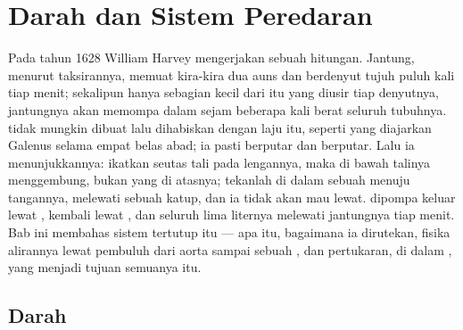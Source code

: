 \chapter{Darah dan Sistem Peredaran}\label{ch:b2:blood-circulation}

Pada tahun 1628 William Harvey mengerjakan sebuah hitungan. Jantung,
menurut taksirannya, memuat kira-kira dua auns  dan berdenyut tujuh
puluh kali tiap menit; sekalipun hanya sebagian kecil dari itu yang
diusir tiap denyutnya, jantungnya akan memompa dalam sejam beberapa
kali berat seluruh tubuhnya.  tidak mungkin dibuat lalu
dihabiskan dengan laju itu, seperti yang diajarkan Galenus selama empat
belas abad; ia pasti berputar dan berputar. Lalu ia menunjukkannya:
ikatkan seutas tali pada lengannya, maka  di bawah talinya
menggembung, bukan yang di atasnya; tekanlah  di dalam sebuah 
menuju tangannya, melewati sebuah katup, dan ia tidak akan mau lewat.
 dipompa keluar lewat , kembali lewat , dan seluruh
lima liternya melewati jantungnya tiap menit. Bab ini membahas sistem
tertutup itu --- apa  itu, bagaimana ia dirutekan, fisika
alirannya lewat pembuluh dari aorta sampai sebuah , dan
pertukaran, di dalam , yang menjadi tujuan semuanya itu.

\section{Darah}

